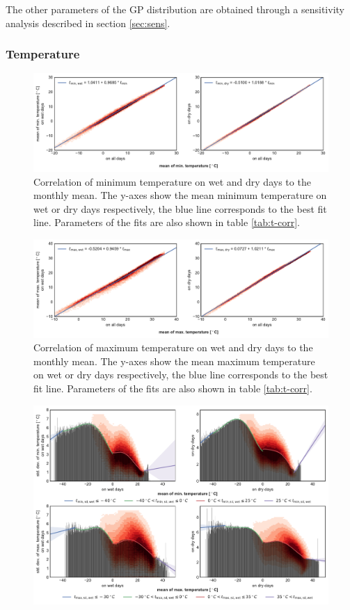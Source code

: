 \documentclass[
11pt, %
english, %
singlespacing, %
headsepline, %
]{MastersDoctoralThesis} %
\begin{document}
\begin{NoHyper}
\begin{refsection}
The other parameters of the GP distribution are obtained through a sensitivity analysis described in section \ref{sec:sens}.

\subsubsection{Temperature}

\begin{figure}
	\includegraphics[width=\linewidth]{gwgen-figures/f05.pdf}
	\caption[Correlation of minimum temperature on wet and dry days to the monthly mean]{Correlation of minimum temperature on wet and dry days to the monthly mean. The y-axes show the mean minimum temperature on wet or dry days respectively, the blue line corresponds to the best fit line. Parameters of the fits are also shown in table \ref{tab:t-corr}.}
	\label{fig:tmin}
\end{figure}
\begin{figure}
	\includegraphics[width=\linewidth]{gwgen-figures/f06.pdf}
	\caption[Correlation of maximum temperature on wet and dry days to the monthly mean]{Correlation of maximum temperature on wet and dry days to the monthly mean. The y-axes show the mean maximum temperature on wet or dry days respectively, the blue line corresponds to the best fit line. Parameters of the fits are also shown in table \ref{tab:t-corr}.}
	\label{fig:tmax}
\end{figure}
\begin{figure}
	\includegraphics[width=12cm]{gwgen-figures/f07.pdf}

\end{figure}
\end{refsection}
\end{NoHyper}
\end{document}
